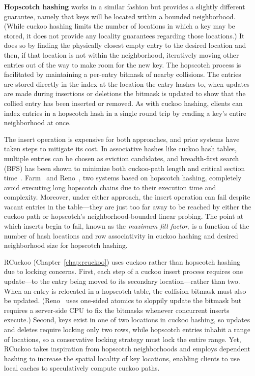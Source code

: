 \documentclass[12pt]{ucsddissertation}
\begin{document}
\textbf{Hopscotch hashing} works in a similar fashion but provides a slightly different guarantee,
namely that keys will be located within a bounded neighborhood. (While cuckoo hashing limits the
number of locations in which a key may be stored, it does not provide any locality guarantees
regarding those locations.) It does so by finding the physically closest empty entry to the desired
location and then, if that location is not within the neighborhood, iteratively moving other entries
out of the way to make room for the new key. The hopscotch process is facilitated by maintaining a
per-entry bitmask of nearby collisions. The entries are stored directly in the index at the location
the entry hashes to, when updates are made during insertions or deletions the bitmask is updated to
show that the collied entry has been inserted or removed. As with cuckoo hashing, clients can index
entries in a hopscotch hash in a single round trip by reading a key’s entire neighborhood at once.

The insert operation is expensive for both approaches, and prior systems have taken steps to
mitigate its cost. In associative hashes like cuckoo hash tables, multiple entries can be chosen as
eviction candidates, and breadth-first search (BFS) has been shown to minimize both cuckoo-path
length and critical section time~\cite{memc3,cuckoo-improvements}. Farm~\cite{farm} and
Reno~\cite{reno}, two systems based on hopscotch hashing, completely avoid executing long hopscotch
chains due to their execution time and complexity. Moreover, under either approach, the insert
operation can fail despite vacant entries in the table—they are just too far away to be reached by
either the cuckoo path or hopscotch’s neighborhood-bounded linear probing. The point at which
inserts begin to fail, known as the \emph{maximum fill factor}, is a function of the number of hash
locations and row associativity in cuckoo hashing and desired neighborhood size for hopscotch
hashing.

RCuckoo (Chapter~\ref{chap:rcuckoo}) uses cuckoo rather than hopscotch hashing due to locking
concerns. First, each step of a cuckoo insert process requires one update—to the entry being moved
to its secondary location—rather than two. When an entry is relocated in a hopscotch table, the
collision bitmask must also be updated. (Reno~\cite{reno} uses one-sided atomics to sloppily update
the bitmask but requires a server-side CPU to fix the bitmasks whenever concurrent inserts execute.)
Second, keys exist in one of two locations in cuckoo hashing, so updates and deletes require locking
only two rows, while hopscotch entries inhabit a range of locations, so a conservative locking
strategy must lock the entire range. Yet, RCuckoo takes inspiration from hopscotch neighborhoods and
employs dependent hashing to increase the spatial locality of key locations, enabling clients to use
local caches to speculatively compute cuckoo paths.
\end{document}
